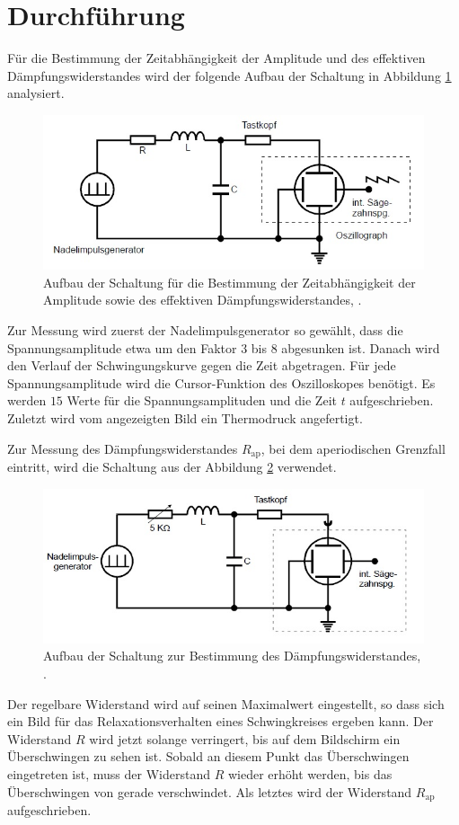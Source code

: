 \section{Durchführung}
\label{sec:Durchführung}
Für die Bestimmung der Zeitabhängigkeit der Amplitude und des effektiven Dämpfungswiderstandes wird der folgende Aufbau der Schaltung in Abbildung \ref{fig:zeit} analysiert.
\begin{figure}[h!]
	\centering
	\includegraphics[width=0.7\linewidth]{Zeit.jpg}
	\caption{Aufbau der Schaltung für die Bestimmung der Zeitabhängigkeit der Amplitude sowie des effektiven Dämpfungswiderstandes, \cite[11]{anleitung354}.}
	\label{fig:zeit}
\end{figure}
Zur Messung wird zuerst der Nadelimpulsgenerator so gewählt, dass die Spannungsamplitude etwa um den Faktor $3$ bis $8$ abgesunken ist. Danach wird den Verlauf der Schwingungskurve gegen die Zeit abgetragen. 
Für jede Spannungsamplitude wird die Cursor-Funktion des Oszilloskopes benötigt. Es werden $15$ Werte für die Spannungsamplituden und die Zeit $t$ aufgeschrieben. Zuletzt wird vom angezeigten Bild ein Thermodruck angefertigt.

Zur Messung des Dämpfungswiderstandes $R_{\text{ap}}$, bei dem aperiodischen Grenzfall eintritt, wird die Schaltung aus der Abbildung \ref{fig:widerstand} verwendet.
\begin{figure}[h!]
	\centering
	\includegraphics[width=0.7\linewidth]{widerstand.jpg}
	\caption{Aufbau der Schaltung zur Bestimmung des Dämpfungswiderstandes, \cite[12]{anleitung354}.}
	\label{fig:widerstand}
\end{figure}
Der regelbare Widerstand wird auf seinen Maximalwert eingestellt, so dass sich ein Bild für das Relaxationsverhalten eines Schwingkreises ergeben kann. Der Widerstand $R$ wird jetzt solange verringert, bis auf dem
 Bildschirm ein Überschwingen zu sehen ist. Sobald an diesem Punkt das Überschwingen eingetreten ist, muss der Widerstand $R$ wieder erhöht werden, bis das Überschwingen von gerade verschwindet. Als letztes wird der 
 Widerstand $R_{\text{ap}}$ aufgeschrieben.

